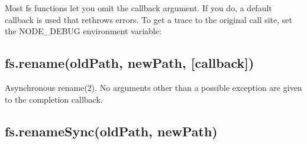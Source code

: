 Most fs functions let you omit the callback argument. If you do, a
default callback is used that rethrows errors. To get a trace to the
original call site, set the NODE\_DEBUG environment variable:

\begin{Shaded}
\begin{Highlighting}[]
 
  \NormalTok{(}\NormalTok{);}
\NormalTok{\}}

\NormalTok{:}
         
              \NormalTok{^}
    \NormalTok{:}\NormalTok{:}\NormalTok{)}
    \NormalTok{:}\NormalTok{:}\NormalTok{)}
     \NormalTok{(}\NormalTok{:}\NormalTok{:}\NormalTok{)}
    \OtherTok{/}\OtherTok{/}\NormalTok{:}\NormalTok{:}\NormalTok{)}
    \OtherTok{/}\OtherTok{/}\NormalTok{:}\NormalTok{:}\NormalTok{)}
    \NormalTok{<}
\end{Highlighting}
\end{Shaded}

\subsection{fs.rename(oldPath, newPath, {[}callback{]})}

Asynchronous rename(2). No arguments other than a possible exception are
given to the completion callback.

\subsection{fs.renameSync(oldPath, newPath)}

